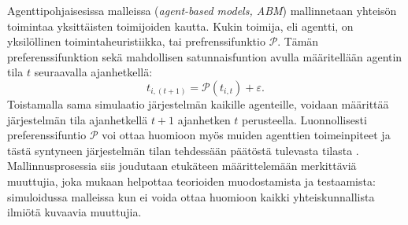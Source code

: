 \documentclass[finnish,gradu,twoside,12pt]{tktltiki}
\begin{document}
Agenttipohjaisesissa malleissa (\textit{agent-based models, ABM}) mallinnetaan yhteisön toimintaa yksittäisten toimijoiden kautta. Kukin toimija, eli agentti, on yksilöllinen toimintaheuristiikka, tai prefrenssifunktio $\mathcal{P}$. Tämän preferenssifunktion sekä mahdollisen satunnaisfuntion avulla määritellään agentin tila $t$ seuraavalla ajanhetkellä: $$t_{i,(t+1)} = \mathcal{P}( t_{i,t} ) + \varepsilon.$$ Toistamalla sama simulaatio järjestelmän kaikille agenteille, voidaan määrittää järjestelmän tila ajanhetkellä $t+1$ ajanhetken $t$ perusteella. Luonnollisesti preferenssifuntio $\mathcal{P}$ voi ottaa huomioon myös muiden agenttien toimeinpiteet ja tästä syntyneen järjestelmän tilan tehdessään päätöstä tulevasta tilasta \citep[esimerkiksi][]{Bonabeau2002}. Mallinnusprosessia siis joudutaan etukäteen määrittelemään merkittäviä muuttujia, joka \citet{Gilbert1993} mukaan helpottaa teorioiden muodostamista ja testaamista: simuloidussa malleissa kun ei voida ottaa huomioon kaikki yhteiskunnallista ilmiötä kuvaavia muuttujia.
\end{document}
